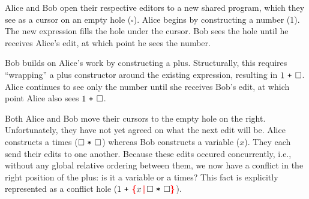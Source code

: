 \documentclass[nonacm, acmsmall, screen, review]{acmart}
\newcommand{\id}[1]{\textcolor{gray}{\ensuremath{#1}}}
\newcommand{\eid}[2]{{#2}^{\id{#1}}}
\newcommand{\ePlus}[3]{#2~\eid{#1}{\texttt{+}}~#3}
\newcommand{\eTimes}[3]{#2~\eid{#1}{\texttt{*}}~#3}
\newcommand{\hole}{\ensuremath{\square}} %
\newcommand{\conflictHole}[1]{%
{\noexpandarg\StrSubstitute{#1}{,}{\textcolor{red}{\,\textbf{|}\,}}[\myargs]%
{\textcolor{red}{\textbf{\{}}\myargs\textcolor{red}{\textbf{\}}}}}}%
\begin{document}
Alice and Bob open their respective editors to a new shared program,
which they see as a cursor on an empty hole ($\hole$).
Alice begins by constructing a number (1).
The new expression fills the hole under the cursor.
Bob sees the hole until he receives Alice's edit,
at which point he sees the number.

Bob builds on Alice's work by constructing a plus.
Structurally, this requires ``wrapping'' a plus constructor around the existing expression, resulting in $\ePlus{}{1}{\hole}$.
Alice continues to see only the number until she receives Bob's edit,
at which point Alice also sees $\ePlus{}{1}{\hole}$.





Both Alice and Bob move their cursors to the empty hole on the right.
Unfortunately, they have not yet agreed on what the next edit will be.
Alice constructs a times ($\eTimes{}{\hole}{\hole}$) whereas Bob constructs a variable ($x$).
They each send their edits to one another.
Because these edits occured concurrently, i.e., without any global relative ordering between them, we now have a conflict in the right position of the plus: is it a variable or a times?
This fact is explicitly represented as a conflict hole ($\ePlus{}{1}{\conflictHole{x, \eTimes{}{\hole}{\hole}}}$).
\end{document}
